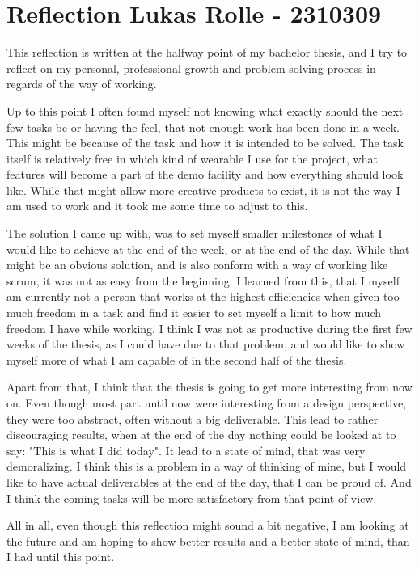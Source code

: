 \documentclass[a4paper]{report}
\begin{document}
\chapter*{Reflection \normalsize{Lukas Rolle - 2310309}}
This reflection is written at the halfway point of my bachelor thesis, and I try to reflect on my personal, professional growth and problem solving process in regards of the way of working.

Up to this point I often found myself not knowing what exactly should the next few tasks be or having the feel, that not enough work has been done in a week. This might be because of the task and how it is intended to be solved. The task itself is relatively free in which kind of wearable I use for the project, what features will become a part of the demo facility and how everything should look like. While that might allow more creative products to exist, it is not the way I am used to work and it took me some time to adjust to this.

The solution I came up with, was to set myself smaller milestones of what I would like to achieve at the end of the week, or at the end of the day. While that might be an obvious solution, and is also conform with a way of working like scrum, it was not as easy from the beginning. I learned from this, that I myself am currently not a person that works at the highest efficiencies when given too much freedom in a task and find it easier to set myself a limit to how much freedom I have while working. I think I was not as productive during the first few weeks of the thesis, as I could have due to that problem, and would like to show myself more of what I am capable of in the second half of the thesis.

Apart from that, I think that the thesis is going to get more interesting from now on. Even though most part until now were interesting from a design perspective, they were too abstract, often without a big deliverable. This lead to rather discouraging results, when at the end of the day nothing could be looked at to say: "This is what I did today". It lead to a state of mind, that was very demoralizing. I think this is a problem in a way of thinking of mine, but I would like to have actual deliverables at the end of the day, that I can be proud of. And I think the coming tasks will be more satisfactory from that point of view.

All in all, even though this reflection might sound a bit negative, I am looking at the future and am hoping to show better results and a better state of mind, than I had until this point.
\end{document}

